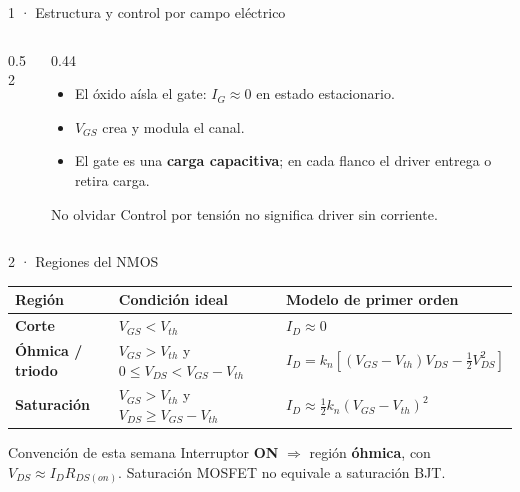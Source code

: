 \documentclass[aspectratio=169]{beamer}
\begin{document}
\begin{frame}{1 · Estructura y control por campo eléctrico}
  \begin{columns}[T]
    \begin{column}{0.52\textwidth}
      \centering
    \end{column}
    \begin{column}{0.44\textwidth}
      \begin{itemize}
        \item El óxido aísla el gate: $I_G\approx0$ en estado estacionario.
        \item $V_{GS}$ crea y modula el canal.
        \item El gate es una \textbf{carga capacitiva}; en cada flanco el driver
          entrega o retira carga.
      \end{itemize}
      \begin{block}{No olvidar}
        Control por tensión no significa driver sin corriente.
      \end{block}
    \end{column}
  \end{columns}
\end{frame}

\begin{frame}{2 · Regiones del NMOS}
  \small
  \begin{tabular}{p{}p{}p{}}
    \toprule
    Región & Condición ideal & Modelo de primer orden \\
    \midrule
    \textbf{Corte} & $V_{GS}<V_{th}$ & $I_D\approx0$ \\
    \textbf{Óhmica / triodo} & $V_{GS}>V_{th}$ y $0\le V_{DS}<V_{GS}-V_{th}$ &
      $I_D=k_n\!\left[(V_{GS}-V_{th})V_{DS}-\tfrac12V_{DS}^{2}\right]$ \\
    \textbf{Saturación} & $V_{GS}>V_{th}$ y $V_{DS}\ge V_{GS}-V_{th}$ &
      $I_D\approx\tfrac12k_n(V_{GS}-V_{th})^2$ \\
    \bottomrule
  \end{tabular}
  \vfill
  \begin{block}{Convención de esta semana}
    Interruptor \textbf{ON} $\Rightarrow$ región \textbf{óhmica}, con
    $V_{DS}\approx I_D R_{DS(on)}$. Saturación MOSFET no equivale a
    saturación BJT.
  \end{block}
\end{frame}
\end{document}
